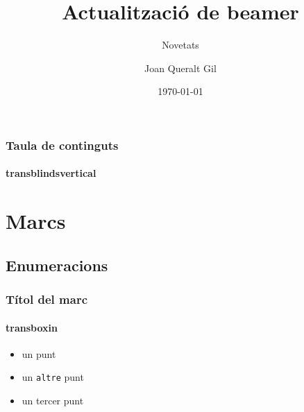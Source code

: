 \documentclass{beamer}
\title[Beamer]{Actualització de beamer}
\subtitle{Novetats}
\author[Joan Queralt]{Joan Queralt Gil}
\institute[cata\LaTeX] 
{
  cata\LaTeX{}\\
  El lloc català de \LaTeX{}
}
\date[30.07.2012]{\today}
\begin{document}
\begin{frame}
  \titlepage
  \transblindshorizontal
\end{frame}


\begin{frame}
  \frametitle{Taula de continguts} %
  \framesubtitle{transblindsvertical}
  
  \tableofcontents[pausesections] %
  \transblindsvertical
   

\end{frame}

\section{Marcs} %
\subsection{Enumeracions}


\begin{frame}
  \frametitle{Títol del marc}
  \framesubtitle{transboxin}
   \begin{itemize}
		  \item 
		    un punt
		  \item
		    un \texttt{altre} punt
		  \item
		  un tercer punt
  \end{itemize}
  \transboxin
  

\end{frame}
\end{document}
